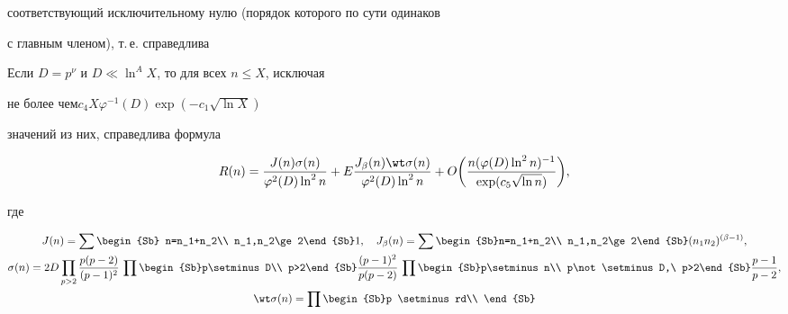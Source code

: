 соответствующий исключительному нулю (порядок которого по сути одинаков


с главным членом), т.\,е. справедлива





\begin{thm}


Если $D=p^\nu$ и $D\ll \ln^A X$, то для всех $n\le X$, исключая


не более чем\linebreak $c_4 X\varphi^{-1}(D)\exp(-c_1\sqrt{\ln X})$ 


значений из них, справедлива формула


$$


R(n)=\frac{J(n)\sigma(n)}{\varphi^2(D)\ln^2 n}+


E\frac{J_{\beta}(n)\wt\sigma(n)}{\varphi^2(D)\ln^2 n}+


O\bigg(\frac{n(\varphi(D)\ln^2 n)^{-1}}{\exp(c_5\sqrt{\ln n})}\bigg),


$$


где


\begin{gather*}


J(n)=\sum\begin{Sb} n=n_1+n_2\\ n_1,n_2\ge 2\end{Sb}1,\quad


J_{\beta}(n)=\sum\begin{Sb}n=n_1+n_2\\ n_1,n_2\ge 2\end{Sb}


(n_1n_2)^{(\beta -1)},\\


%


\sigma(n)=2D\prod_{p>2}\frac{p(p-2)}{(p-1)^2}\,


\prod\begin{Sb}p\setminus D\\ p>2\end{Sb}\frac{(p-1)^2}{p(p-2)}\,


\prod\begin{Sb}p\setminus n\\


p\not\setminus D,\ p>2\end{Sb}\frac{p-1}{p-2}, \\


%


\wt\sigma(n)=\prod\begin{Sb}p \setminus rd\\



\end{Sb}
\end{gather*}
\end{thm}
